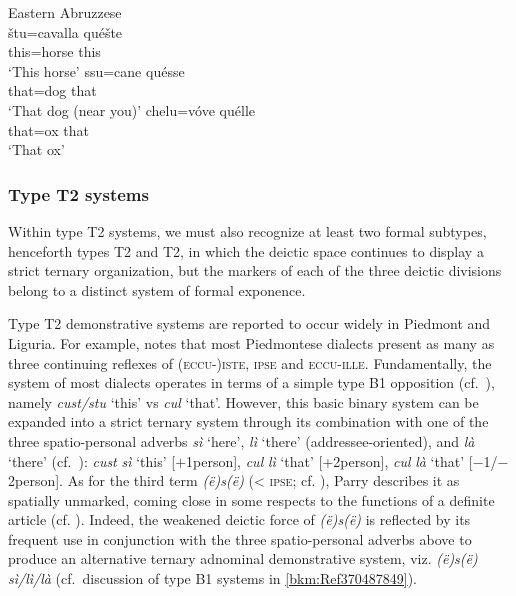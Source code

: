 \documentclass[output=paper]{langsci/langscibook}
\begin{document}
\ea Eastern Abruzzese \citep{Verratti:1968a}\\
    \ea
    \gll štu=cavalla  quéšte\\
             this=horse  this\\
    \glt \enquote*{This horse}
    \ex
    \gll ssu=cane  quésse\\
             that=dog  that\\
    \glt  \enquote*{That dog (near you)}
    \ex
    \gll  chelu=vóve  quélle\\
            that=ox  that\\
    \glt \enquote*{That ox}
    \z
\z

\subsubsection{\label{bkm:Ref370495541}Type T2 systems}

Within type T2 systems, we must also recognize at least two formal subtypes,
henceforth types T2 and T2, in which the deictic space continues
to display a strict ternary organization, but the markers of each of the three
deictic divisions belong to a distinct system of formal exponence.

Type T2 demonstrative systems are reported to occur widely in Piedmont
and Liguria. For example, \citet[241]{Parry:1997a} notes that most Piedmontese
dialects present as many as three  continuing reflexes of
\textsc{(eccu-)iste,} \textsc{ipse} and \textsc{eccu-ille}. Fundamentally, the
system of most dialects operates in terms of a simple type B1 opposition
(cf.\ ), namely \emph{cust/stu} ‘this’ vs \emph{cul}
‘that’. However, this basic binary system can be expanded into a strict ternary
system through its combination with one of the three spatio-personal adverbs
\emph{sì} ‘here’, \emph{lì} ‘there’ (addressee-oriented), and \emph{là} ‘there’
(cf.\ \citealt[219]{Lombardi-Vallauri:1995a}): \emph{cust} \emph{sì} ‘this’
[$+$1person], \emph{cul} \emph{lì} ‘that’ [+2person], \emph{cul} \emph{là} ‘that’
[$-$1/$-$2person]. As for the third term \emph{(ë)s(ë)} (< \textsc{ipse}; cf.
\citealt{Ascoli:1901a}), Parry describes it as spatially unmarked, coming close
in some respects to the functions of a definite article (cf.
\citealt[214]{Lombardi-Vallauri:1995a}). Indeed, the weakened deictic force of
\emph{(ë)s(ë)} is reflected by its frequent use in conjunction with the three
spatio-personal adverbs above to produce an alternative ternary adnominal
demonstrative system, viz. \emph{(ë)s(ë)} \emph{sì/lì/là} (cf.\ discussion of
type B1 systems in \cref{bkm:Ref370487849}).
\end{document}
